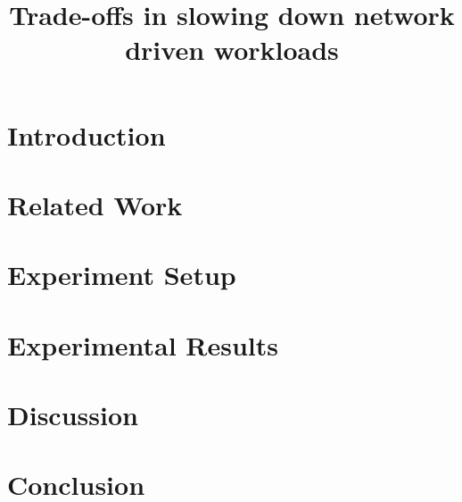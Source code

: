 \documentclass[sigplan,10pt]{acmart}
\begin{document}
\title{Trade-offs in slowing down network driven workloads}


\maketitle
\pagestyle{empty} 

\section{Introduction}


\section{Related Work}


\section{Experiment Setup}


\section{Experimental Results}




\section{Discussion}

\section{Conclusion}


\end{document}

